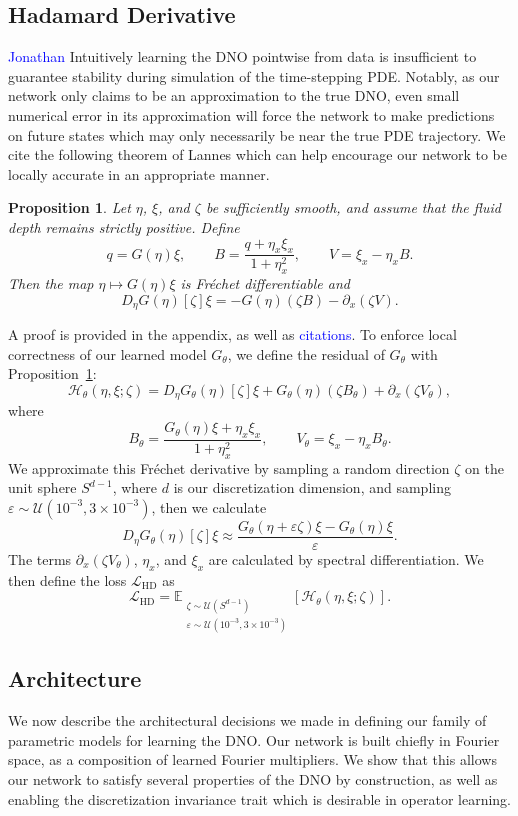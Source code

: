 \documentclass{article}
\newtheorem{proposition}{Proposition}
\begin{document}
\subsection{Hadamard Derivative}
\textcolor{blue}{Jonathan}
Intuitively learning the DNO pointwise from data is insufficient to
guarantee stability during simulation of the time-stepping PDE. Notably,
as our network only claims to be an approximation to the true DNO, even
small numerical error in its approximation will force the network to make
predictions on future states which may only necessarily be near the true
PDE trajectory. We cite the following theorem of Lannes which can help
encourage our network to be locally accurate in an appropriate manner.
\begin{proposition}
\label{prop:dno-shape-derivative}
Let $\eta$, $\xi$, and $\zeta$ be sufficiently smooth, and assume that the
fluid depth remains strictly positive. Define
\[
q=G(\eta)\xi,\qquad
B=\frac{q+\eta_x\xi_x}{1+\eta_x^2},\qquad V=\xi_x-\eta_xB.
\]
Then the map $\eta\mapsto G(\eta)\xi$ is Fr\'echet differentiable and
\[
    D_\eta G(\eta)[\zeta]\xi=-G(\eta)(\zeta B)-\partial_x(\zeta V).
\]
\end{proposition}
A proof is provided in the appendix, as well as \textcolor{blue}{citations}.
To enforce local correctness of our learned model $G_\theta$, we define
the residual of $G_\theta$ with Proposition~\ref{prop:dno-shape-derivative}:
\[
\mathcal H_\theta(\eta,\xi;\zeta)
=D_\eta G_\theta(\eta)[\zeta]\xi
 +G_\theta(\eta)(\zeta B_\theta)+\partial_x(\zeta V_\theta),
\]
where
\[
B_\theta=\frac{G_\theta(\eta)\xi+\eta_x\xi_x}{1+\eta_x^2},
\qquad V_\theta=\xi_x-\eta_xB_\theta.
\]
We approximate this Fr\'echet derivative by sampling a random direction
$\zeta$ on the unit sphere $S^{d-1}$, where $d$ is our discretization
dimension, and sampling $\varepsilon\sim\mathcal U(10^{-3},3\times10^{-3})$,
then we calculate
\[
D_\eta G_\theta(\eta)[\zeta]\xi\approx
\frac{G_\theta(\eta+\varepsilon\zeta)\xi-G_\theta(\eta)\xi}{\varepsilon}.
\]
The terms $\partial_x(\zeta V_\theta)$, $\eta_x$, and $\xi_x$ are calculated
by spectral differentiation. We then define the loss $\mathcal L_{\mathrm{HD}}$
as
\begin{equation}
\mathcal L_{\mathrm{HD}}=
\mathbb E_{\substack{\zeta\sim\mathcal U(S^{d-1})\\
\varepsilon\sim\mathcal U(10^{-3},3\times10^{-3})}}
[\mathcal H_\theta(\eta,\xi;\zeta)].
\end{equation}

\subsection{Architecture}
\label{sec:architecture}
We now describe the architectural decisions we made in defining our family
of parametric models for learning the DNO. Our network is built chiefly in
Fourier space, as a composition of learned Fourier multipliers. We show that
this allows our network to satisfy several properties of the DNO by
construction, as well as enabling the discretization invariance trait which
is desirable in operator learning.
\end{document}
